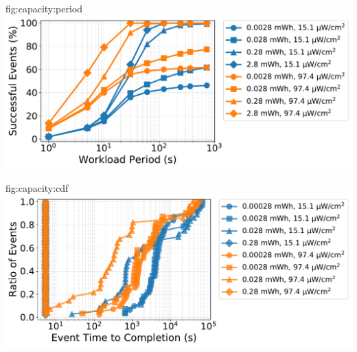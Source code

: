 \begin{definefigure}{fig:capacity:period}
      \centering
      \includegraphics[width=\linewidth]{figs/capacity/sense_and_send/events_vs_period}
    \caption{
    In we investigate the period at which different secondary storage sizes
    meet a specific reliability, showing that even with infrequent periodic
    workloads, small amounts of secondary storage have low reliability while
    larger secondary stores reach near 100\% reliability. 
    } 
\end{definefigure}
    
\begin{definefigure}{fig:capacity:cdf}
      \centering
      \includegraphics[width=\linewidth]{figs/capacity/ota_update/ttc_ota}
      \caption{
      A CDF of time to completion of a long-running, high energy event.
        In this
        workload, events are not atomic, and can be paused and resumed based on
        available energy. With secondary capacities that are large relative to the
        workload (which takes 93\,mJ) we see immediate completion.
        However, performing the event on smaller secondary capacities can take
        between three hours and a day to complete even for scenarios with large
        amounts of harvestable ambient energy.
      }
\end{definefigure}

